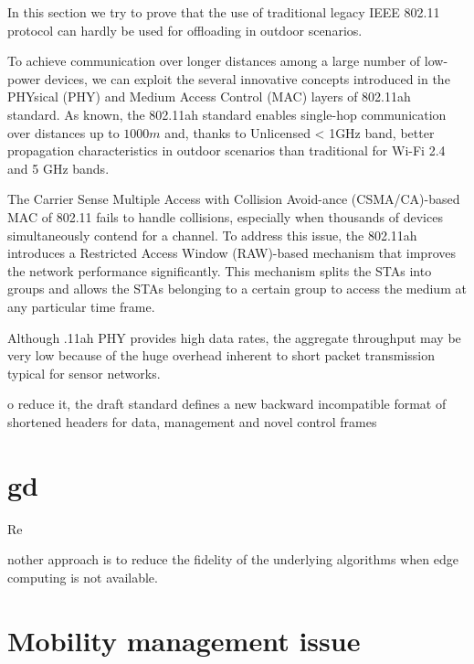 \documentclass[sigchi]{acmart}
\begin{document}
In this section we try to prove that the use of traditional legacy IEEE 802.11 protocol can hardly be used for offloading in outdoor scenarios.

To achieve communication over longer distances among a large number of low-power devices, we can exploit the several innovative concepts introduced in the PHYsical (PHY) and Medium Access Control (MAC) layers of 802.11ah standard. As known, the 802.11ah standard enables single-hop communication over distances up to $1000 m$ and, thanks to Unlicensed < 1GHz band, better propagation characteristics in outdoor scenarios than traditional for Wi-Fi 2.4 and 5 GHz bands.

The Carrier Sense Multiple Access with Collision Avoid-ance (CSMA/CA)-based MAC of 802.11 fails to handle collisions, especially when thousands of devices simultaneously contend for a channel. To address this issue, the 802.11ah introduces a Restricted Access Window (RAW)-based mechanism that improves the network performance significantly. This mechanism splits the STAs into groups and allows the STAs belonging to a certain group to access the medium at any particular time frame.

Although .11ah PHY provides high data rates, the aggregate throughput may be very low because of the huge overhead inherent to short packet transmission typical for sensor networks.

o reduce it, the draft standard defines a new backward incompatible
format of shortened headers for data, management and novel control frames








\section{gd}

Re










nother approach is to reduce the
ﬁdelity of the underlying algorithms when edge computing is
not available.




\section{Mobility management issue}
\end{document}
